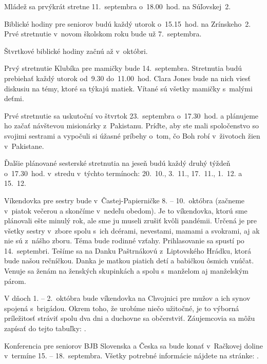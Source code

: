 Mládež sa prvýkrát stretne 11.~septembra o~18.00~hod. na Súľovskej~2.


Biblické hodiny pre seniorov budú každý utorok o~15.15~hod. na Zrínskeho~2. Prvé stretnutie v~novom školskom roku bude už 7.~septembra.

Štvrtkové biblické hodiny začnú až v~októbri.


Prvý stretnutie Klubíka pre mamičky bude 14.~septembra. Stretnutia budú prebiehať každý utorok od~9.30 do~11.00~hod. Clara Jones bude na nich viesť diskusiu na témy, ktoré sa týkajú matiek. Vítané sú všetky mamičky s~malými deťmi.


Prvé stretnutie sa uskutoční vo štvrtok 23.~septembra o~17.30~hod. a plánujeme ho začať návštevou misionárky z~Pakistanu. Príďte, aby ste mali spoločenstvo so svojimi sestrami a vypočuli si úžasné príbehy o~tom, čo Boh robí v~životoch žien v~Pakistane.

Ďalšie plánované sesterské stretnutia na jeseň budú každý druhý týždeň o~17.30~hod. v~stredu v~týchto termínoch: 20.~10., 3.~11., 17.~11., 1.~12. a 15.~12.
\vfill\break


Víkendovka pre sestry bude v~Častej-Papierničke 8. -- 10.~októbra (začneme v~piatok večerou a skončíme v~nedeľu obedom). Je to víkendovka, ktorú sme plánovali ešte minulý rok, ale sme ju museli zrušiť kvôli pandémii. Určená je pre všetky sestry v~zbore spolu s~ich dcérami, nevestami, mamami a svokrami, aj ak nie sú z~nášho zboru. Téma bude rodinné vzťahy. Prihlasovanie sa spustí po 14.~septembri. Tešíme sa na Danku Paštrnákovú z~Liptovského Hrádku, ktorá bude našou rečníčkou. Danka je matkou piatich detí a babičkou ôsmich vnúčat. Venuje sa ženám na ženských skupinkách a spolu s~manželom aj manželským párom.


V dňoch 1. -- 2.~októbra bude víkendovka na Chvojnici pre mužov a ich synov spojená s~brigádou. Okrem toho, že urobíme niečo užitočné, je to výborná príležitosť stráviť spolu dva dni a duchovne sa občerstviť. Záujemcovia sa môžu zapísať do tejto tabuľky: .


Konferencia pre seniorov BJB Slovenska a Česka sa bude konať v~Račkovej doline v~termíne 15. -- 18.~septembra. Všetky potrebné informácie nájdete na stránke: .
\vfill\break


